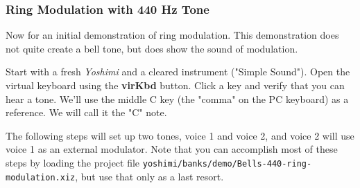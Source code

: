 \subsubsection{Ring Modulation with 440 Hz Tone}
\label{subsec:cookbook_instruments_ring_mod_440}

   Now for an initial demonstration of ring modulation.
   This demonstration does not quite create a bell tone, but does show
   the sound of modulation.

   Start with a fresh \textsl{Yoshimi} and a cleared instrument ("Simple
   Sound").  Open the virtual keyboard using the \textbf{virKbd} button.
   Click a key and verify that you can hear a tone.
   We'll use the middle C
   key (the "comma" on the PC keyboard) as a reference.  We will call it
   the "C" note.

   The following steps will set up two tones, voice 1 and voice 2, and voice
   2 will use voice 1 as an external modulator.
   Note that you can accomplish most of these steps by loading the project
   file
   \texttt{yoshimi/banks/demo/Bells-440-ring-modulation.xiz}, but use
   that only as a last resort.

